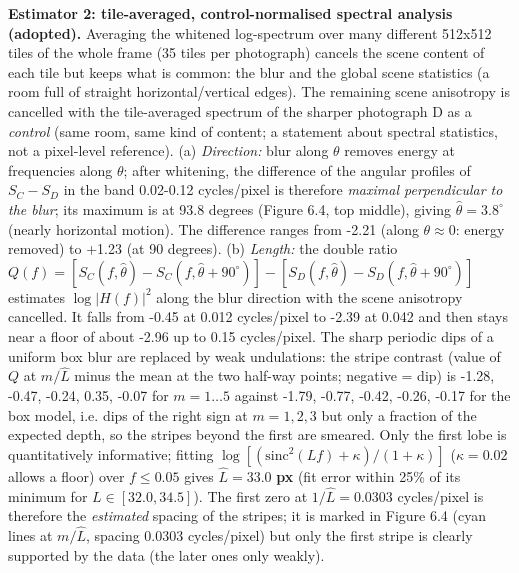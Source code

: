 \documentclass[10pt,a4paper]{article}
\begin{document}
\textbf{Estimator 2: tile-averaged, control-normalised spectral analysis (adopted).} Averaging the whitened log-spectrum over many different 512x512 tiles of the whole frame (35 tiles per photograph) cancels the scene content of each tile but keeps what is common: the blur and the global scene statistics (a room full of straight horizontal/vertical edges). The remaining scene anisotropy is cancelled with the tile-averaged spectrum of the sharper photograph D as a \textit{control} (same room, same kind of content; a statement about spectral statistics, not a pixel-level reference). (a) \textit{Direction:} blur along $\theta$ removes energy at frequencies along $\theta$; after whitening, the difference of the angular profiles of $S_C-S_D$ in the band 0.02-0.12 cycles/pixel is therefore \textit{maximal perpendicular to the blur}; its maximum is at 93.8 degrees (Figure 6.4, top middle), giving $\hat\theta=3.8^\circ$ (nearly horizontal motion). The difference ranges from -2.21 (along $\theta\approx0$: energy removed) to +1.23 (at 90 degrees). (b) \textit{Length:} the double ratio $Q(f)=[S_C(f,\hat\theta)-S_C(f,\hat\theta+90^\circ)]-[S_D(f,\hat\theta)-S_D(f,\hat\theta+90^\circ)]$ estimates $\log|H(f)|^2$ along the blur direction with the scene anisotropy cancelled. It falls from -0.45 at 0.012 cycles/pixel to -2.39 at 0.042 and then stays near a floor of about -2.96 up to 0.15 cycles/pixel. The sharp periodic dips of a uniform box blur are replaced by weak undulations: the stripe contrast (value of $Q$ at $m/\hat L$ minus the mean at the two half-way points; negative = dip) is -1.28, -0.47, -0.24, 0.35, -0.07 for $m=1\ldots5$ against -1.79, -0.77, -0.42, -0.26, -0.17 for the box model, i.e. dips of the right sign at $m=1,2,3$ but only a fraction of the expected depth, so the stripes beyond the first are smeared. Only the first lobe is quantitatively informative; fitting $\log[(\mathrm{sinc}^2(Lf)+\kappa)/(1+\kappa)]$ ($\kappa=0.02$ allows a floor) over $f\le0.05$ gives $\hat L=33.0$\textbf{ px} (fit error within 25\% of its minimum for $L\in[32.0,34.5]$). The first zero at $1/\hat L=0.0303$ cycles/pixel is therefore the \textit{estimated} spacing of the stripes; it is marked in Figure 6.4 (cyan lines at $m/\hat L$, spacing 0.0303 cycles/pixel) but only the first stripe is clearly supported by the data (the later ones only weakly).
\end{document}
